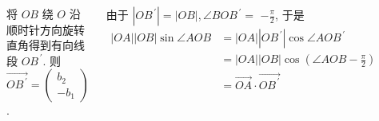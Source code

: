 \documentclass[10pt,punct]{ctexbeamer}
\begin{document}
\begin{frame}
    \begin{columns}[c]
        \column{8cm}


        将 $O B$ 绕 $O$ 沿顺时针方向旋转直角得到有向线 段 $O B^{\, \prime}$. 则 $\overrightarrow{O B^{\, \prime}}=\left(\begin{array}{r}b_2 \\ -b_1\end{array}\right)$.




        由于 $\left|O B^{\, \prime}\right|=|O B|, \angle B O B^{\, \prime}=$ $-\frac{\pi}{2}$, 于是
        $$
        \begin{aligned}
            |O A||O B| \sin \angle A O B
            & = |O A|\left|O B^{\, \prime}\right| \cos \angle A O B^{\, \prime}\\
            & = |O A||O B| \cos \left(\angle A O B-\frac{\pi}{2}\right) \\
            & =\overrightarrow{O A} \cdot \overrightarrow{O B^{\, \prime}}
        \end{aligned}
        $$



        \column{4.5cm}
        \begin{figure}[p]
            \includegraphics[scale=0.4]{det-2.png}
        \end{figure}





\end{columns}
\end{frame}
\end{document}
